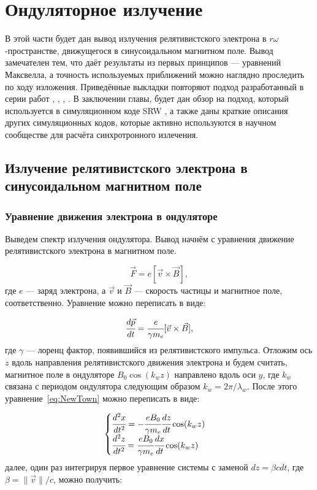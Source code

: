 \chapter{Ондуляторное излучение}
В этой части будет дан вывод излучения релятивистского электрона в $r\omega$-пространстве, движущегося в синусоидальном магнитном поле. Вывод замечателен тем, что даёт результаты из первых принципов --- уравнений Максвелла, а точность используемых приближений можно наглядно проследить по ходу изложения. Приведённые выкладки повторяют подход разработанный в серии работ \cite{geloni2005paraxial}, \cite{geloni2007fourier}, \cite{geloni2015brightness }, \cite{geloni2006fourier}. В заключении главы, будет дан обзор на подход, который используется в симуляционном коде SRW \cite{chubar1998proceedings}, а также даны краткие описания других симуляционных кодов, которые активно используются в научном сообществе для расчёта синхротронного излечения. 
\section{Излучение релятивистского электрона в синусоидальном магнитном поле}
\subsection{Уравнение движения электрона в ондуляторе}
Выведем спектр излучения ондулятора. Вывод начнём с уравнения движение релятивистского электрона в магнитном поле.

\begin{equation}
	\vec{F} = e[\vec{v} \times \vec{B}],
\end{equation} 
где $e$ --- заряд электрона, а $\vec{v}$ и $\vec{B}$ --- скорость частицы и магнитное поле, соответственно. Уравнение можно переписать в виде:

\begin{equation}
	\label{eq:NewTown}
	\cfrac{d\vec{p}}{dt} = \cfrac{e}{\gamma m_e}[\vec{v} \times \vec{B}],
\end{equation}
где $\gamma$ --- лоренц фактор, появившийся из релятивистского импульса. Отложим ось $z$ вдоль направления релятивистского движения электрона и будем считать, магнитное поле в ондуляторе $B_0\cos(k_w z)$ направлено вдоль оси $y$, где $k_w$ связана с периодом ондулятора следующим образом $k_w = 2\pi/\lambda_w$. После этого уравнение~\ref{eq:NewTown} можно переписать в виде:

\begin{equation}
	\label{eq:eq_of_motion}
	\begin{cases}
		\cfrac{d^2 x}{dt^2} = - \cfrac{e B_0}{\gamma m_e}\cfrac{dz}{dt} \cos(k_w z)\\
		\cfrac{d^2 z}{dt^2} = \cfrac{e B_0}{\gamma m_e}\cfrac{dx}{dt} \cos(k_w z)
	\end{cases} 
\end{equation}
далее, один раз интегрируя первое уравнение системы с заменой $dz = \beta cdt$, где $\beta = \|\vec{v}\| /c$, можно получить: 

